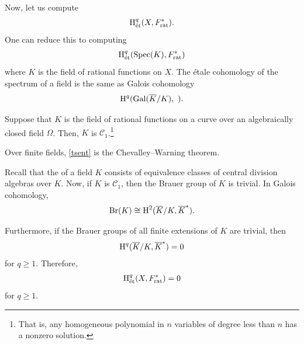 \documentclass [11 pt, oneside] {article}
\begin{document}
Now, let us compute
\begin{align*}
	\operatorname{H}_{\textup {\'et}}^{q}(X,\relax{F}_{\textup {rat}}^{*}).
\end{align*}
One can reduce this to computing
\begin{align*}
	\operatorname{H}_{\textup {\'et}}^{q}(\operatorname{Spec}(K), \relax{F}_{\textup {rat}}^{*})
\end{align*}
where $K$ is the field of rational functions on $X$. 
The \'etale cohomology of the spectrum of a field is the same as Galois cohomology
\begin{align*}
	\operatorname{H}^{q}(\operatorname{Gal}(\overline{K}/K),\ ).
\end{align*}
\begin{theorem}[Tsen]\label{tsent}\text{}
Suppose that $K$ is the field of rational functions on a curve over an algebraically closed field $\Omega$. Then, $K$ is $\mathscr{C}_{1}$.\footnote{That is, any homogeneous polynomial in $n$ variables of degree less than $n$ has a nonzero solution.}
\end{theorem}

\begin{remark}
	Over finite fields, \cref{tsent} is the Chevalley--Warning theorem.
\end{remark}

Recall that the  of a field $K$ consists of equivalence classes of central division algebras over $K$. 
Now, if $K$ is $\mathscr{C}_{1}$, then the Brauer group of $K$ is trivial. 
In Galois cohomology,
\begin{align*}
	\operatorname{Br}(K) \cong \operatorname{H}^{2}(\overline{K}/K, \overline{K}^*).
\end{align*}

Furthermore, if the Brauer groups of all finite extensions of $K$ are trivial, then
\begin{align*}
	\operatorname{H}^{q} (\overline{K}/K, \overline{K}^{*}) =0
\end{align*}
for $q\ge 1$.
Therefore,
\begin{align*}
	\operatorname{H}_{\textup {\'et}}^{q}(X,\relax{F}_{\textup {rat}}^{*}) = 0
\end{align*}
for $q\ge 1$.
\end{document}
